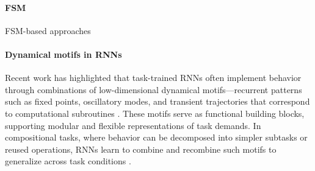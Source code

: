 \documentclass{article}
\theoremstyle{definition} \newtheorem{definition}{Definition}  \newtheorem{example}{Example}
\theoremstyle{remark} \newtheorem{remark}{Remark}
\newcounter{ct}
\begin{document}
\paragraph{FSM} FSM-based approaches\citep{pollack1991induction, casey1996dynamics, jacobsson2005ruleextraction, ashwin2021excitable, oliva2019fsm, cotteret2024fsm}

\paragraph{Dynamical motifs in RNNs}
Recent work has highlighted that task-trained RNNs often implement behavior through combinations of low-dimensional dynamical motifs—recurrent patterns such as fixed points, oscillatory modes, and transient trajectories that correspond to computational subroutines \citep{driscoll2024flexible}.
These motifs serve as functional building blocks, supporting modular and flexible representations of task demands. 
In compositional tasks, where behavior can be decomposed into simpler subtasks or reused operations, RNNs learn to combine and recombine such motifs to generalize across task conditions \citep{tafazoli2024building}.

%





\end{document}
